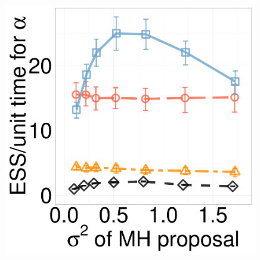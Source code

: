   \begin{figure}[H]
  \centering
  \begin{minipage}[!hp]{0.24\linewidth}

  \centering
    \includegraphics [width=0.99\textwidth, angle=0]{figs/new_experiment_figs/exp_alpha_dim3_k2.pdf}
\end{minipage}
  \begin{minipage}[hp]{0.24\linewidth}
  \centering

\end{minipage}
\end{figure}
